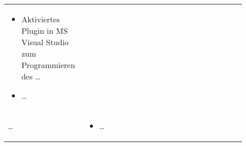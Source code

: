 \begin{table}[hbt]
\begin{tabular}{>{\raggedright\arraybackslash}p{0.3\linewidth} >{\raggedright\arraybackslash}p{0.65\linewidth}}
\begin{itemize}[noitemsep,topsep=0pt,partopsep=0pt,parsep=0pt]
							\item Aktiviertes Plugin in MS Visual Studio zum Programmieren des \ldots
							\item \ldots
							\end{itemize} \\ 
		\ldots	&	\vspace{-\topsep}
					\begin{itemize}[noitemsep,topsep=0pt,partopsep=0pt,parsep=0pt] 
					\item \ldots
					\end{itemize} \\ 
		\hline 
	\end{tabular} 
\end{table}










